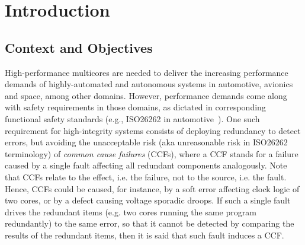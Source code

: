 \clearpage
\newpage
\section{Introduction}

{\color{magenta}

}



\subsection{Context and Objectives}

High-performance multicores are needed to deliver the increasing performance demands of highly-automated and autonomous systems in automotive, avionics and space, among other domains. However, performance demands come along with safety requirements in those domains, as dictated in corresponding functional safety standards (e.g., ISO26262 in automotive~\cite{ISO26262}).
One such requirement for high-integrity systems consists of deploying redundancy to detect errors, but avoiding the unacceptable risk (aka unreasonable risk in ISO26262 terminology) of \emph{common cause failures} (CCFs), where a CCF stands for a failure caused by a single fault affecting all redundant components analogously. Note that CCFs relate to the effect, i.e. the failure, not to the source, i.e. the fault. Hence, CCFs could be caused, for instance, by a soft error affecting clock logic of two cores, or by a defect causing voltage sporadic droops. If such a single fault drives the redundant items (e.g. two cores running the same program redundantly) to the same error, so that it cannot be detected by comparing the results of the redundant items, then it is said that such fault induces a CCF.

